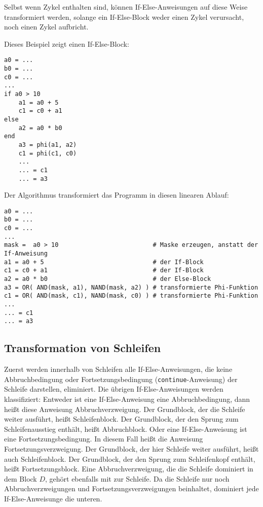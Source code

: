 \documentclass[a4paper,10pt]{article}
\begin{document}
Selbst wenn Zykel enthalten sind, können If-Else-Anweisungen auf diese Weise transformiert werden,
solange ein If-Else-Block weder einen Zykel verursacht, noch einen Zykel aufbricht.

Dieses Beispiel zeigt einen If-Else-Block:

\begin{verbatim}
a0 = ...
b0 = ...
c0 = ...
...
if a0 > 10 
    a1 = a0 + 5
    c1 = c0 + a1
else
    a2 = a0 * b0
end
    a3 = phi(a1, a2)
    c1 = phi(c1, c0)
    ...
    ... = c1
    ... = a3
\end{verbatim}

Der Algorithmus transformiert das Programm in diesen linearen Ablauf:

\begin{verbatim}
a0 = ...
b0 = ...
c0 = ...
...
mask =  a0 > 10                          # Maske erzeugen, anstatt der If-Anweisung
a1 = a0 + 5                              # der If-Block
c1 = c0 + a1                             # der If-Block
a2 = a0 * b0                             # der Else-Block
a3 = OR( AND(mask, a1), NAND(mask, a2) ) # transformierte Phi-Funktion
c1 = OR( AND(mask, c1), NAND(mask, c0) ) # transformierte Phi-Funktion
...
... = c1
... = a3
\end{verbatim}

\subsection{Transformation von Schleifen}

Zuerst werden innerhalb von Schleifen alle If-Else-Anweisungen, die keine Abbruchbedingung oder
Fortsetzungsbedingung (\texttt{continue}-Anweisung) der Schleife darstellen, eliminiert. Die übrigen
If-Else-Anweisungen werden klassifiziert: Entweder ist eine If-Else-Anweisung eine Abbruchbedingung,
dann heißt diese Anweisung Abbruchverzweigung. Der Grundblock, der die Schleife weiter ausführt,
heißt Schleifenblock. Der Grundblock, der den Sprung zum Schleifenausstieg enthält, heißt
Abbruchblock. Oder eine If-Else-Anweisung ist eine Fortsetzungsbedingung. In diesem Fall heißt die
Anweisung Fortsetzungsverzweigung. Der Grundblock, der hier Schleife weiter ausführt, heißt auch
Schleifenblock. Der Grundblock, der den Sprung zum Schleifenkopf enthält, heißt Fortsetzungsblock.
Eine Abbruchverzweigung, die die Schleife dominiert in dem Block $D$, gehört ebenfalls mit zur
Schleife. Da die Schleife nur noch Abbruchverzweigungen und Fortsetzungsverzweigungen beinhaltet,
dominiert jede If-Else-Anweisunge die unteren.
\end{document}
